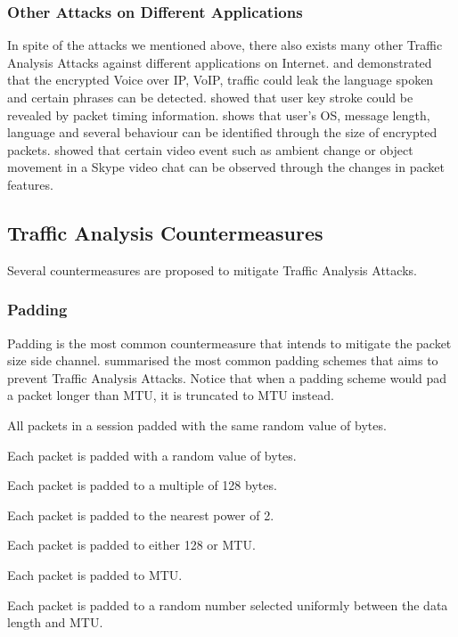\subsubsection{Other Attacks on Different Applications}
In spite of the attacks we mentioned above, there also exists many other Traffic Analysis Attacks against different applications on Internet. \cite{VoIPLanguage} and \cite{VoIPPhrases} demonstrated that the encrypted Voice over IP, VoIP, traffic could leak the language spoken and certain phrases can be detected. \cite{SSHKey} showed that user key stroke could be revealed by packet timing information. \cite{AppleMessage} shows that user's OS, message length, language and several behaviour can be identified through the size of encrypted packets. \cite{Video} showed that certain video event such as ambient change or object movement in a Skype video chat can be observed through the changes in packet features.

\subsection{Traffic Analysis Countermeasures}

Several countermeasures are proposed to mitigate Traffic Analysis Attacks. 

\subsubsection{Padding}

Padding is the most common countermeasure that intends to mitigate the packet size side channel. \cite{Peekaboo} summarised the most common padding schemes that aims to prevent Traffic Analysis Attacks. Notice that when a padding scheme would pad a packet longer than MTU, it is truncated to MTU instead.

\begin{description}[style=nextline]
	\item[Session Random Padding] 
	All packets in a session padded with the same random value of bytes.
	\item[Packet Random Padding]
	Each packet is padded with a random value of bytes.
	\item[Linear Padding]
	Each packet is padded to a multiple of 128 bytes.
	\item[Exponential Padding]
	Each packet is padded to the nearest power of 2.
	\item[Mice-Elephants Padding]
	Each packet is padded to either 128 or MTU.
	\item[Pad to MTU]
	Each packet is padded to MTU.
	\item[Packet Random MTU Padding]
	Each packet is padded to a random number selected uniformly between the data length and MTU.
\end{description}

